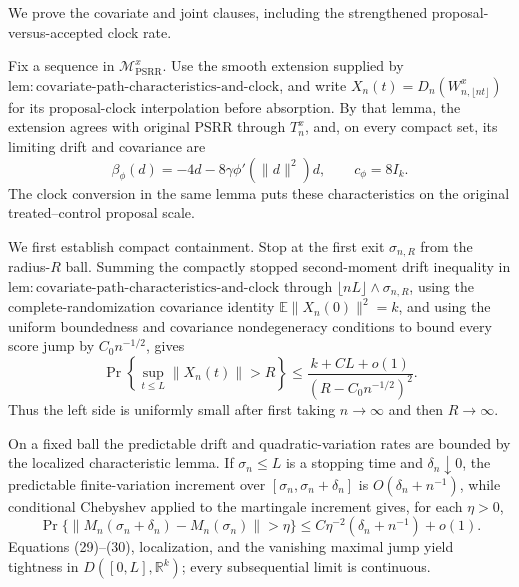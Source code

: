 We prove the covariate and joint clauses, including the strengthened proposal-versus-accepted clock rate.

Fix a sequence in \(\mathcal M_{\mathrm{PSRR}}^x\). Use the smooth extension supplied by
\(\mathrm{lem{:}covariate\mbox{-}path\mbox{-}characteristics\mbox{-}and\mbox{-}clock}\), and write
\(X_n(t)=D_n(W^x_{n,\lfloor nt\rfloor})\) for its proposal-clock interpolation before absorption. By that lemma, the extension agrees with original PSRR through \(T_n^x\), and, on every compact set, its limiting drift and covariance are
\[
 \beta_\phi(d)=-4d-8\gamma\phi'(\|d\|^2)d,
 \qquad c_\phi=8I_k. \tag{28}
\]
The clock conversion in the same lemma puts these characteristics on the original treated--control proposal scale.

We first establish compact containment. Stop at the first exit \(\sigma_{n,R}\) from the radius-\(R\) ball. Summing the compactly stopped second-moment drift inequality in
\(\mathrm{lem{:}covariate\mbox{-}path\mbox{-}characteristics\mbox{-}and\mbox{-}clock}\) through
\(\lfloor nL\rfloor\wedge\sigma_{n,R}\), using the complete-randomization covariance identity
\(\mathbb E\|X_n(0)\|^2=k\), and using the uniform boundedness and covariance nondegeneracy conditions to bound every score jump by \(C_0n^{-1/2}\), gives
\[
 \Pr\!\left\{\sup_{t\le L}\|X_n(t)\|>R\right\}
 \le \frac{k+CL+o(1)}{(R-C_0n^{-1/2})^2}. \tag{29}
\]
Thus the left side is uniformly small after first taking \(n\to\infty\) and then \(R\to\infty\).

On a fixed ball the predictable drift and quadratic-variation rates are bounded by the localized characteristic lemma. If \(\sigma_n\le L\) is a stopping time and \(\delta_n\downarrow0\), the predictable finite-variation increment over \([\sigma_n,\sigma_n+\delta_n]\) is \(O(\delta_n+n^{-1})\), while conditional Chebyshev applied to the martingale increment gives, for each \(\eta>0\),
\[
 \Pr\{\|M_n(\sigma_n+\delta_n)-M_n(\sigma_n)\|>\eta\}
 \le C\eta^{-2}(\delta_n+n^{-1})+o(1). \tag{30}
\]
Equations (29)--(30), localization, and the vanishing maximal jump yield tightness in
\(D([0,L],\mathbb R^k)\); every subsequential limit is continuous.

